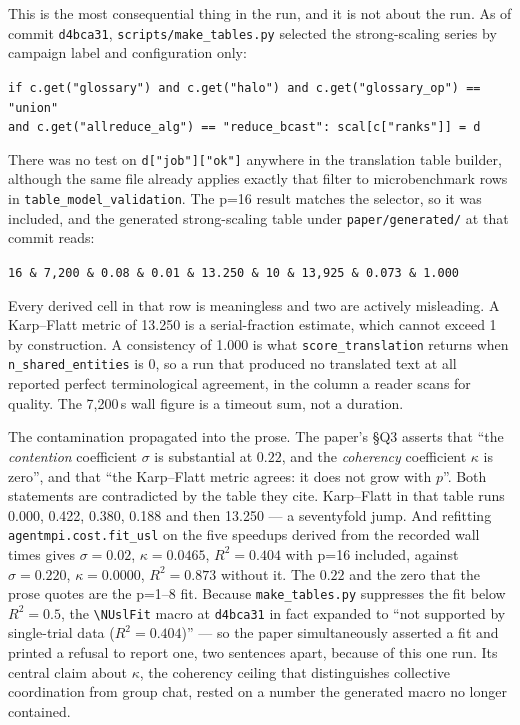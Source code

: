 \documentclass[11pt]{article}
\begin{document}
This is the most consequential thing in the run, and it is not about the run. As of
commit \texttt{d4bca31}, \texttt{scripts/make\_tables.py} selected the strong-scaling
series by campaign label and configuration only:

\begin{center}
\texttt{if c.get("glossary") and c.get("halo") and c.get("glossary\_op") == "union"} \\
\texttt{and c.get("allreduce\_alg") == "reduce\_bcast": scal[c["ranks"]] = d}
\end{center}

There was no test on \texttt{d["job"]["ok"]} anywhere in the translation table builder,
although the same file already applies exactly that filter to microbenchmark rows in
\texttt{table\_model\_validation}. The p=16 result matches the selector, so it was
included, and the generated strong-scaling table under \texttt{paper/generated/} at that
commit reads:

\begin{center}
\texttt{16 \& 7,200 \& 0.08 \& 0.01 \& 13.250 \& 10 \& 13,925 \& 0.073 \& 1.000}
\end{center}

Every derived cell in that row is meaningless and two are actively misleading. A
Karp--Flatt metric of 13.250 is a serial-fraction estimate, which cannot exceed 1 by
construction. A consistency of 1.000 is what \texttt{score\_translation} returns when
\texttt{n\_shared\_entities} is 0, so a run that produced no translated text at all
reported perfect terminological agreement, in the column a reader scans for quality. The
7{,}200\,s wall figure is a timeout sum, not a duration.

The contamination propagated into the prose. The paper's \S Q3 asserts that ``the
\emph{contention} coefficient $\sigma$ is substantial at $0.22$, and the \emph{coherency}
coefficient $\kappa$ is zero'', and that ``the Karp--Flatt metric agrees: it does not
grow with $p$''. Both statements are contradicted by the table they cite. Karp--Flatt in
that table runs 0.000, 0.422, 0.380, 0.188 and then 13.250 --- a seventyfold jump. And
refitting \texttt{agentmpi.cost.fit\_usl} on the five speedups derived from the recorded
wall times gives $\sigma = 0.02$, $\kappa = 0.0465$, $R^2 = 0.404$ with p=16 included,
against $\sigma = 0.220$, $\kappa = 0.0000$, $R^2 = 0.873$ without it. The $0.22$ and
the zero that the prose quotes are the p=1--8 fit. Because \texttt{make\_tables.py}
suppresses the fit below $R^2 = 0.5$, the \verb|\NUslFit| macro at \texttt{d4bca31} in
fact expanded to ``not supported by single-trial data ($R^2=0.404$)'' --- so the paper
simultaneously asserted a fit and printed a refusal to report one, two sentences apart,
because of this one run. Its central claim about $\kappa$, the coherency ceiling that
distinguishes collective coordination from group chat, rested on a number the generated
macro no longer contained.
\end{document}

